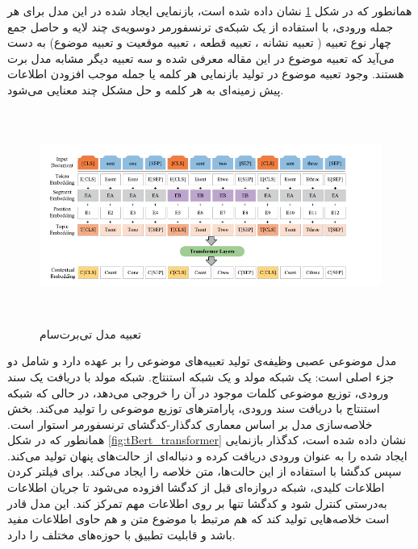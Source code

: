 همانطور که در شکل \ref{fig:tBert_embded} نشان داده شده است، بازنمایی ایجاد شده در این مدل برای هر جمله ورودی، با استفاده از یک شبکه‌ی ترنسفورمر دوسویه‌ی
چند لایه و حاصل جمع چهار نوع تعبیه ( تعبیه نشانه
، تعبیه قطعه
، تعبیه موقعیت و تعبیه موضوع) به دست ‌می‌آید که تعبیه موضوع در این مقاله معرفی شده و سه تعبیه دیگر مشابه مدل برت هستند. وجود تعبیه موضوع در تولید بازنمایی هر کلمه یا جمله موجب افزودن اطلاعات پیش زمینه‌ای به هر کلمه و حل مشکل چند معنایی می‌شود.
\begin{figure}[!h]
	\begin{center}
		\includegraphics[height=7cm]{TbertSum_embedding.png}
	\end{center}
	\caption{ تعبیه مدل تی‌برت‌سام \cite{Ma2022TBERTSumTT}}
	\label{fig:tBert_embded}
	\medskip
	\small
\end{figure}
مدل موضوعی عصبی وظیفه‌ی تولید تعبیه‌های موضوعی را بر عهده دارد و شامل دو جزء اصلی است: یک شبکه مولد و یک شبکه استنتاج. شبکه مولد با دریافت یک سند ورودی، توزیع موضوعی کلمات موجود در آن را خروجی می‌دهد، در حالی که شبکه استنتاج با دریافت سند ورودی، پارامترهای توزیع موضوعی را تولید می‌کند. بخش خلاصه‌سازی مدل بر اساس معماری کدگذار-کدگشای ترنسفورمر استوار است. همانطور که در شکل 
\ref{fig:tBert_transformer}
نشان داده شده است، کدگذار بازنمایی ایجاد شده را به عنوان ورودی دریافت کرده و دنباله‌ای از حالت‌های پنهان تولید می‌کند. سپس کدگشا با استفاده از این حالت‌ها، متن خلاصه را ایجاد می‌کند. برای فیلتر کردن اطلاعات کلیدی، شبکه دروازه‌ای قبل از کدگشا افزوده می‌شود تا جریان اطلاعات به‌درستی کنترل شود و کدگشا تنها بر روی اطلاعات مهم تمرکز کند. این مدل قادر است خلاصه‌هایی تولید کند که هم مرتبط با موضوع متن و هم حاوی اطلاعات مفید باشد و قابلیت تطبیق با حوزه‌های مختلف را دارد.



